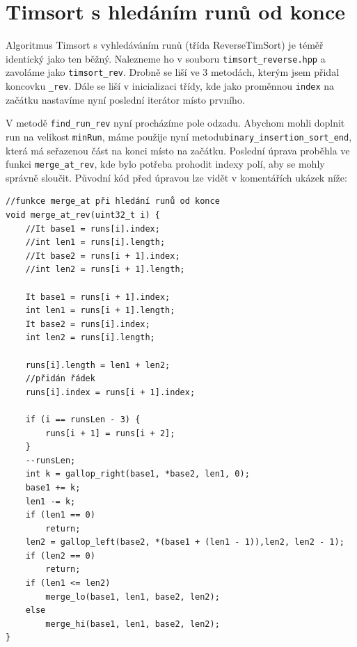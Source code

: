 \documentclass[thesis=B,czech]{FITthesis}[2019/12/23]
\begin{document}
\section{Timsort s hledáním runů od konce}

Algoritmus Timsort s vyhledáváním runů (třída ReverseTimSort) je téměř identický jako ten běžný. Nalezneme ho v souboru \texttt{timsort\_reverse.hpp} a zavoláme jako \texttt{timsort\_rev}. Drobně se liší ve 3 metodách, kterým jsem přidal koncovku \texttt{\_rev}. Dále se liší v inicializaci třídy, kde jako proměnnou \texttt{index} na začátku nastavíme nyní poslední iterátor místo prvního. 

V metodě \texttt{find\_run\_rev} nyní procházíme pole odzadu. Abychom mohli doplnit run na velikost \texttt{minRun}, máme použije nyní metodu\linebreak \texttt{binary\_insertion\_sort\_end}, která má seřazenou část na konci místo na začátku. Poslední úprava proběhla ve funkci \texttt{merge\_at\_rev}, kde bylo potřeba prohodit indexy polí, aby se mohly správně sloučit. Původní kód před úpravou lze vidět v komentářích ukázek níže: 

\begin{verbatim}
//funkce merge_at při hledání runů od konce
void merge_at_rev(uint32_t i) {
    //It base1 = runs[i].index;
    //int len1 = runs[i].length;
    //It base2 = runs[i + 1].index;
    //int len2 = runs[i + 1].length;
       
    It base1 = runs[i + 1].index;
    int len1 = runs[i + 1].length;
    It base2 = runs[i].index;
    int len2 = runs[i].length;
        
    runs[i].length = len1 + len2;
    //přidán řádek
    runs[i].index = runs[i + 1].index;
        
    if (i == runsLen - 3) {
        runs[i + 1] = runs[i + 2];
    }
    --runsLen;
    int k = gallop_right(base1, *base2, len1, 0);
    base1 += k;
    len1 -= k;
    if (len1 == 0)
        return;
    len2 = gallop_left(base2, *(base1 + (len1 - 1)),len2, len2 - 1);
    if (len2 == 0)
        return;
    if (len1 <= len2)
        merge_lo(base1, len1, base2, len2);
    else
        merge_hi(base1, len1, base2, len2);
}


\end{verbatim}
\end{document}
